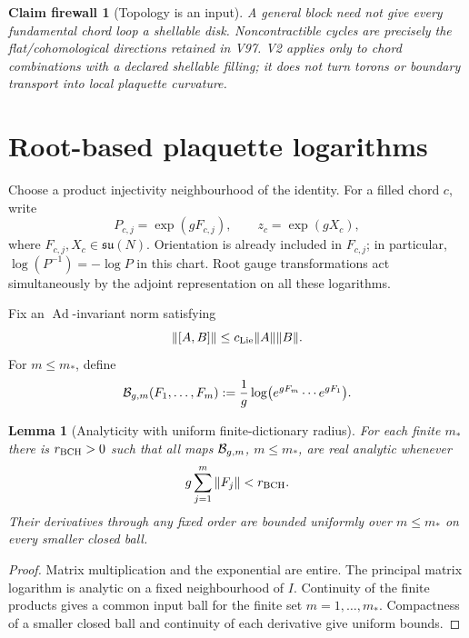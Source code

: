 \documentclass[11pt,oneside]{book}
\newtheorem{lemma}[theorem]{Lemma}
\newtheorem{firewall}[theorem]{Claim firewall}
\theoremstyle{definition}
\theoremstyle{remark}
\begin{document}
\begin{firewall}[Topology is an input]
\label{fire:e8v2-topology}
A general block need not give every fundamental chord loop a shellable
disk.  Noncontractible cycles are precisely the flat/cohomological
directions retained in V97.  V2 applies only to chord combinations
with a declared shellable filling; it does not turn torons or boundary
transport into local plaquette curvature.
\end{firewall}

\section{Root-based plaquette logarithms}
\label{sec:e8v2-logs}

Choose a product injectivity neighbourhood of the identity.  For a
filled chord \(c\), write
\[
 P_{c,j}=\exp(gF_{c,j}),\qquad
 z_c=\exp(gX_c),                                     \label{eq:e8v2-logs}
\]
where \(F_{c,j},X_c\in\mathfrak{su}(N)\).  Orientation is already
included in \(F_{c,j}\); in particular,
\(\log(P^{-1})=-\log P\) in this chart.  Root gauge transformations
act simultaneously by the adjoint representation on all these
logarithms.

Fix an \(\operatorname{Ad}\)-invariant norm satisfying
\[
 \|[A,B]\|\leq c_{\rm Lie}\|A\|\|B\|.                \label{eq:e8v2-bracket}
\]
For \(m\leq m_*\), define
\[
 {\cal B}_{g,m}(F_1,\ldots,F_m)
 :=
 \frac1g\log\bigl(e^{gF_m}\cdots e^{gF_1}\bigr).
                                                        \label{eq:e8v2-BCH-map}
\]

\begin{lemma}[Analyticity with uniform finite-dictionary radius]
\label{lem:e8v2-analytic}
For each finite \(m_*\) there is \(r_{\rm BCH}>0\) such that all maps
\({\cal B}_{g,m}\), \(m\leq m_*\), are real analytic whenever
\[
 g\sum_{j=1}^m\|F_j\|<r_{\rm BCH}.                   \label{eq:e8v2-radius}
\]
Their derivatives through any fixed order are bounded uniformly over
\(m\leq m_*\) on every smaller closed ball.
\end{lemma}

\begin{proof}
Matrix multiplication and the exponential are entire.  The principal
matrix logarithm is analytic on a fixed neighbourhood of \(I\).
Continuity of the finite products gives a common input ball for the
finite set \(m=1,\ldots,m_*\).  Compactness of a smaller closed ball
and continuity of each derivative give uniform bounds.
\end{proof}
\end{document}
